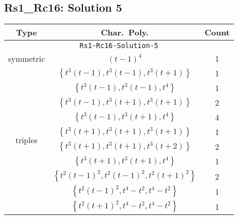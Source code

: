 \documentclass{article}
\begin{document}
        \subsection{Rs1\_Rc16: Solution 5}
        \begin{tabular}{|c|c|c|}
        \hline
        \textbf{Type} & \textbf{Char.~Poly.} & \textbf{Count} \\
        \hline \multicolumn{3}{|c|}{\texttt{Rs1-Rc16-Solution-5}} \\ \hline
        \multirow{1}{*}{symmetric}
        & $(t - 1)^4$ & 1 \\
        \hline
        \multirow{10}{*}{triples}
         & $\left\{t^3(t - 1),t^3(t - 1),t^3(t + 1)\right\}$ & 1 \\
         & $\left\{t^3(t - 1),t^3(t - 1),t^4\right\}$ & 1 \\
         & $\left\{t^3(t - 1),t^3(t + 1),t^3(t + 1)\right\}$ & 2 \\
         & $\left\{t^3(t - 1),t^3(t + 1),t^4\right\}$ & 4 \\
         & $\left\{t^3(t + 1),t^3(t + 1),t^3(t + 1)\right\}$ & 1 \\
         & $\left\{t^3(t + 1),t^3(t + 1),t^3(t + 2)\right\}$ & 2 \\
         & $\left\{t^3(t + 1),t^3(t + 1),t^4\right\}$ & 1 \\
         & $\left\{t^2(t - 1)^2,t^2(t - 1)^2,t^2(t + 1)^2\right\}$ & 2 \\
         & $\left\{t^2(t - 1)^2,t^4 - t^2,t^4 - t^2\right\}$ & 1 \\
         & $\left\{t^2(t + 1)^2,t^4 - t^2,t^4 - t^2\right\}$ & 1 \\
        \hline
        \end{tabular}
        
        \newpage
        
\end{document}
